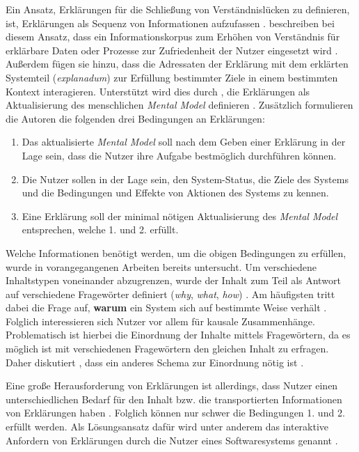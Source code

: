 Ein Ansatz, Erklärungen für die Schließung von Verständnislücken zu definieren, ist, Erklärungen als Sequenz von Informationen aufzufassen \cite[vgl.][]{wang_integration_2020}. \citeauthor{sovrano_modelling_2020} beschreiben bei diesem Ansatz, dass ein Informationskorpus zum Erhöhen von Verständnis für erklärbare Daten oder Prozesse zur Zufriedenheit der Nutzer eingesetzt wird \cite[übersetzt vgl.][]{sovrano_modelling_2020}. Außerdem fügen sie hinzu, dass die Adressaten der Erklärung mit dem erklärten Systemteil (\textit{explanadum}) zur Erfüllung bestimmter Ziele in einem bestimmten Kontext interagieren. Unterstützt wird dies durch \citeauthor{zahedi_towards_2019}, die Erklärungen als \glqq Aktualisierung des menschlichen \textit{Mental Model}\grqq{} definieren \cite[übersetzt vgl.][]{zahedi_towards_2019}. Zusätzlich formulieren die Autoren die folgenden drei Bedingungen an Erklärungen:
\begin{enumerate}
    \item Das aktualisierte \textit{Mental Model} soll nach dem Geben einer Erklärung in der Lage sein, dass die Nutzer ihre Aufgabe bestmöglich durchführen können.
    \item Die Nutzer sollen in der Lage sein, den System-Status, die Ziele des Systems und die Bedingungen und Effekte von Aktionen des Systems zu kennen.
    \item Eine Erklärung soll der minimal nötigen Aktualisierung des \textit{Mental Model} entsprechen, welche 1. und 2. erfüllt.
\end{enumerate}

Welche Informationen benötigt werden, um die obigen Bedingungen zu erfüllen, wurde in vorangegangenen Arbeiten bereits untersucht. Um verschiedene Inhaltstypen voneinander abzugrenzen, wurde der Inhalt zum Teil als Antwort auf verschiedene Fragewörter definiert (\textit{why}, \textit{what}, \textit{how}) \cite{rosenfeld_explainability_2019}. Am häufigsten tritt dabei die Frage auf, \textbf{warum} ein System sich auf bestimmte Weise verhält \cite{chazette2020explainability}. Folglich interessieren sich Nutzer vor allem für kausale Zusammenhänge. Problematisch ist hierbei die Einordnung der Inhalte mittels Fragewörtern, da es möglich ist mit verschiedenen Fragewörtern den gleichen Inhalt zu erfragen. Daher diskutiert \citeauthor{wang_integration_2020}, dass ein anderes Schema zur Einordnung nötig ist \cite{wang_integration_2020}.

Eine große Herausforderung von Erklärungen ist allerdings, dass Nutzer einen unterschiedlichen Bedarf für den Inhalt bzw. die transportierten Informationen von Erklärungen haben \cite{chazette2020explainability}. Folglich können nur schwer die Bedingungen 1. und 2. erfüllt werden. Als Lösungsansatz dafür wird unter anderem das interaktive Anfordern von Erklärungen durch die Nutzer eines Softwaresystems genannt \cite{chazette_end-users_nodate}.

